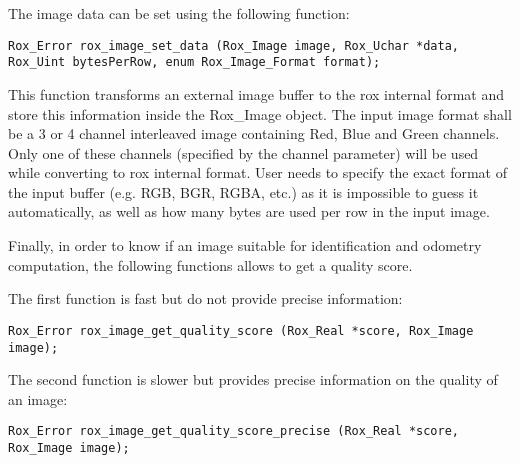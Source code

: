 The image data can be set using the following function:
\begin{lstlisting}
Rox_Error rox_image_set_data (Rox_Image image, Rox_Uchar *data, Rox_Uint bytesPerRow, enum Rox_Image_Format format);
\end{lstlisting}
This function transforms an external image buffer to the rox internal
format and store this information inside the Rox\_Image object.  The
input image format shall be a 3 or 4 channel interleaved image
containing Red, Blue and Green channels.  Only one of these channels
(specified by the channel parameter) will be used while converting to
rox internal format.  User needs to specify the exact format of the
input buffer (e.g. RGB, BGR, RGBA, etc.) as it is impossible to guess
it automatically, as well as how many bytes are used per row in the
input image.

Finally, in order to know if an image suitable for identification and odometry computation, the following functions allows to get a quality score.

The first function is fast but do not provide precise information: 
\begin{lstlisting}
Rox_Error rox_image_get_quality_score (Rox_Real *score, Rox_Image image);
\end{lstlisting}

The second function is slower but provides precise information on the quality of an image:
\begin{lstlisting}
Rox_Error rox_image_get_quality_score_precise (Rox_Real *score, Rox_Image image);
\end{lstlisting}
